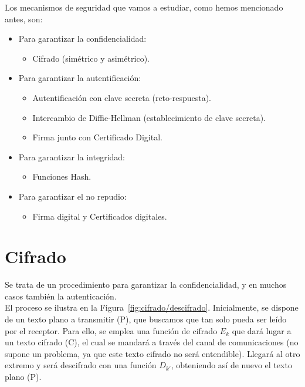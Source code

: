 Los mecanismos de seguridad que vamos a estudiar, como hemos mencionado antes, son:
\begin{itemize}
    \item Para garantizar la confidencialidad:
    \begin{itemize}
        \item Cifrado (simétrico y asimétrico).
    \end{itemize}
    \item Para garantizar la autentificación:
    \begin{itemize}
        \item Autentificación con clave secreta (reto-respuesta).
        \item Intercambio de Diffie-Hellman (establecimiento de clave secreta).
        \item Firma junto con Certificado Digital.
    \end{itemize}

    \item Para garantizar la integridad:
    \begin{itemize}
        \item Funciones Hash.
    \end{itemize}

    \item Para garantizar el no repudio:
    \begin{itemize}
        \item Firma digital y Certificados digitales.
    \end{itemize}
\end{itemize}

\section{Cifrado}
Se trata de un procedimiento para garantizar la confidencialidad, y en muchos casos también la autenticación.\\


El proceso se ilustra en la Figura~\ref{fig:cifrado/descifrado}. Inicialmente, se dispone de un texto plano a transmitir (P), que buscamos que tan solo pueda ser leído por el receptor. Para ello, se emplea una función de cifrado $E_k$ que dará lugar a un texto cifrado (C), el cual se mandará a través del canal de comunicaciones (no supone un problema, ya que este texto cifrado no será entendible). Llegará al otro extremo y será descifrado con una función $D_{k'}$, obteniendo así de nuevo el texto plano (P).

